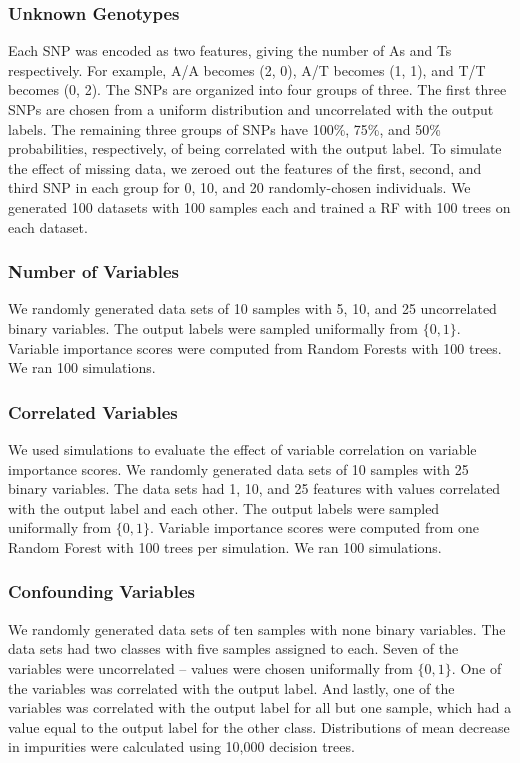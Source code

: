 \subsubsection{Unknown Genotypes}
Each SNP was encoded as two features, giving the number of As and Ts respectively.  For example, A/A becomes (2, 0), A/T becomes (1, 1), and T/T becomes (0, 2).  The SNPs are organized into four groups of three.  The first three SNPs are chosen from a uniform distribution and uncorrelated with the output labels.  The remaining three groups of SNPs have 100\%, 75\%, and 50\% probabilities, respectively, of being correlated with the output label. To simulate the effect of missing data, we zeroed out the features of the first, second, and third SNP in each group for 0, 10, and 20 randomly-chosen individuals.  We generated 100 datasets with 100 samples each and trained a RF with 100 trees on each dataset.  

\subsubsection{Number of Variables}
We randomly generated data sets of 10 samples with 5, 10, and 25 uncorrelated binary variables.  The output labels were sampled uniformally from $\{0, 1\}$.  Variable importance scores were computed from Random Forests with 100 trees.  We ran 100 simulations.

\subsubsection{Correlated Variables}
We used simulations to evaluate the effect of variable correlation on variable importance scores. We randomly generated data sets of 10 samples with 25 binary variables.  The data sets had 1, 10, and 25 features with values correlated with the output label and each other. The output labels were sampled uniformally from $\{0, 1\}$. Variable importance scores were computed from one Random Forest with 100 trees per simulation.  We ran 100 simulations.

\subsubsection{Confounding Variables}
We randomly generated data sets of ten samples with none binary variables. The data sets had two classes with five samples assigned to each.  Seven of the variables were uncorrelated -- values were chosen uniformally from $\{0, 1\}$. One of the variables was correlated with the output label.  And lastly, one of the variables was correlated with the output label for all but one sample, which had a value equal to the output label for the other class.  Distributions of mean decrease in impurities were calculated using 10,000 decision trees.

